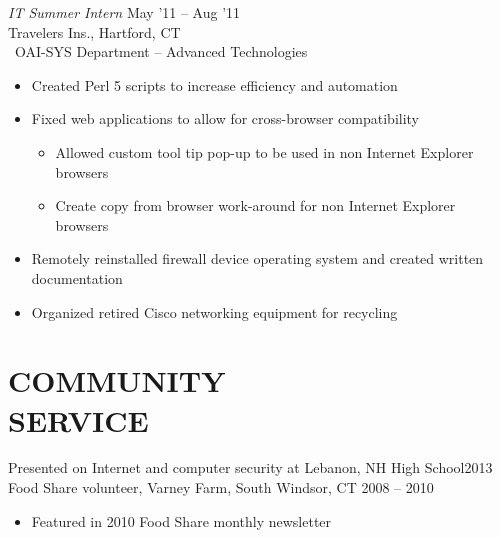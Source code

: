 \documentclass[margin]{res}
\begin{document}
\begin{resume}
                     {\sl IT Summer Intern} \hfill  May '11 -- Aug '11 \\
                     Travelers Ins., Hartford, CT\\\
                     OAI-SYS Department -- Advanced Technologies
                     \begin{itemize}  \itemsep -2pt %
                         \item Created Perl 5 scripts to increase efficiency and 
                               automation
                         \item Fixed web applications to allow for cross-browser 
                               compatibility
                         \begin{itemize}
                             \item Allowed custom tool tip pop-up to be used in non
                                   Internet Explorer \\browsers
                             \item Create copy from browser work-around for non
                                   Internet Explorer \\browsers
                         \end{itemize}
                         \item Remotely reinstalled firewall device operating
                               system and created written \\documentation
                         \item Organized retired Cisco networking equipment for
                               recycling
                     \end{itemize} 
 
\section{COMMUNITY \\ SERVICE} 
                Presented on Internet and computer security at Lebanon, 
                NH High School\hfill 2013\\
                Food Share volunteer, Varney Farm, South Windsor, 
                CT \hfill 2008 -- 2010
                \begin{itemize}
                    \item Featured in 2010 Food Share monthly newsletter
                \end{itemize}
     


\end{resume}
\end{document}
